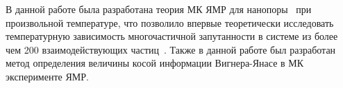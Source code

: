 В данной работе была разработана теория МК ЯМР для нанопоры~\cite{Doronin2019} при произвольной температуре,
что позволило впервые теоретически исследовать температурную зависимость многочастичной запутанности в системе из более чем 200 взаимодействующих частиц~\cite{Doronin2019, Lazarev2020}.
Также в данной работе был разработан~\cite{Doronin2021} метод определения величины косой информации Вигнера-Янасе в МК эксперименте ЯМР.